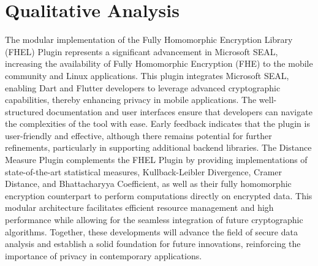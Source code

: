 \section{Qualitative Analysis}
The modular implementation of the Fully Homomorphic Encryption Library (FHEL) Plugin represents a significant advancement in Microsoft SEAL, increasing the availability of Fully Homomorphic Encryption (FHE) to the mobile community and Linux applications. This plugin integrates Microsoft SEAL, enabling Dart and Flutter developers to leverage advanced cryptographic capabilities, thereby enhancing privacy in mobile applications. The well-structured documentation and user interfaces ensure that developers can navigate the complexities of the tool with ease. Early feedback indicates that the plugin is user-friendly and effective, although there remains potential for further refinements, particularly in supporting additional backend libraries.
The Distance Measure Plugin complements the FHEL Plugin by providing implementations of state-of-the-art statistical measures, Kullback-Leibler Divergence, Cramer Distance, and Bhattacharyya Coefficient, as well as their fully homomorphic encryption counterpart to perform computations directly on encrypted data.
This modular architecture facilitates efficient resource management and high performance while allowing for the seamless integration of future cryptographic algorithms. Together, these developments will advance the field of secure data analysis and establish a solid foundation for future innovations, reinforcing the importance of privacy in contemporary applications.
